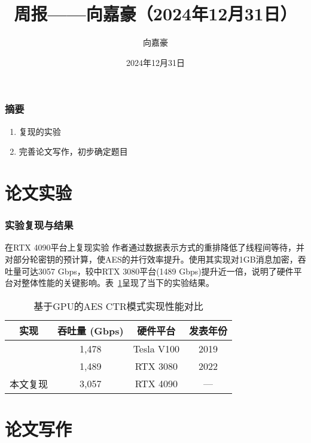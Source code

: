 \documentclass{beamer}
\title{\textbf{周报——向嘉豪（2024年12月31日）}}
\author{向嘉豪}
\institute{衡阳师范学院}
\date{2024年12月31日}
\begin{document}
\begin{frame}
    \titlepage
\end{frame}

\begin{frame}
    \frametitle{摘要}
    \begin{block}{}
        \begin{enumerate}
            \item 复现\cite{Lee2022}的实验
            \item 完善论文写作，初步确定题目
        \end{enumerate}

    \end{block}
\end{frame}



\section{论文实验}

\begin{frame}
    \frametitle{实验复现与结果}
    \begin{block}{在RTX 4090平台上复现\cite{Lee2022}实验}
        作者通过数据表示方式的重排降低了线程间等待，并对部分轮密钥的预计算，使AES的并行效率提升。使用其实现对1GB消息加密，吞吐量可达3057 Gbps，较\cite{Lee2022}中RTX 3080平台(1489 Gbps)提升近一倍，说明了硬件平台对整体性能的关键影响。表~\ref{tab:aes_gpu_compare}呈现了当下的实验结果。
    \end{block}
    \begin{table}[h]
        \centering
        \caption{基于GPU的AES CTR模式实现性能对比}
        \label{tab:aes_gpu_compare}
        \begin{tabular}{cccc}
        \toprule
        \textbf{实现} & \textbf{吞吐量 (Gbps)} & \textbf{硬件平台} & \textbf{发表年份} \\
        \midrule
        \cite{Hajihassani2019} & 1,478 & Tesla V100 & 2019 \\
        \cite{Lee2022}        & 1,489 & RTX 3080   & 2022 \\
        本文复现            & 3,057 & RTX 4090   & --- \\
        \bottomrule
        \end{tabular}
   
        \end{table}
\end{frame}

\section{论文写作}
\end{document}
